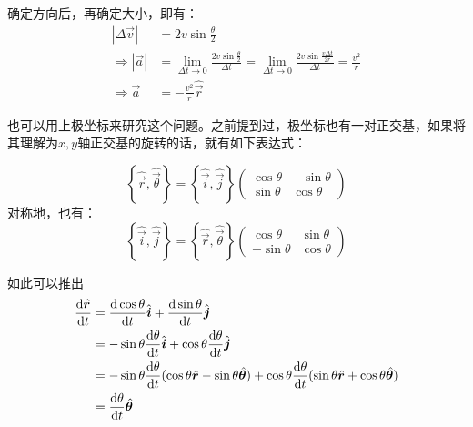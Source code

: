 确定方向后，再确定大小，即有：
\begin{equation}
    \begin{aligned}
        \left | \Delta \vec{v} \right |          & =2v\sin\frac{\theta}{2}                                                                                                                            \\
        \Longrightarrow \left | \vec{a} \right | & =\lim_{\Delta t \to 0}  \frac{2v\sin\frac{\theta}{2}}{\Delta t}=\lim_{\Delta t \to 0}  \frac{2v\sin\frac{v\Delta t}{2r}}{\Delta t}=\frac{v^{2}}{r} \\
        \Longrightarrow \vec{a}                  & =-\frac{v^{2}}{r}\hat{\vec{r}}
    \end{aligned}
    \nonumber
\end{equation}

也可以用上极坐标来研究这个问题。之前提到过，极坐标也有一对正交基，如果将其理解为$x,y$轴正交基的旋转的话，就有如下表达式：

\[\left \{ \hat{\vec{r}},\hat{\vec{\theta}} \right \} =\left \{ \hat{\vec{i}},\hat{\vec{j}} \right \}\begin{pmatrix}
        \cos\theta & -\sin\theta \\
        \sin\theta & \cos\theta
    \end{pmatrix} \]
对称地，也有：
\[\left \{ \hat{\vec{i}},\hat{\vec{j}} \right \} =\left \{ \hat{\vec{r}},\hat{\vec{\theta}} \right \}\begin{pmatrix}
        \cos\theta   & \sin\theta \\
        - \sin\theta & \cos\theta
    \end{pmatrix} \]

如此可以推出
\begin{equation}
    \begin{aligned}
        \frac{\dif \hat{\vec{r}}}{\dif t} & =\frac{\dif \cos\theta}{\dif t}\hat{\vec{i}}+\frac{\dif \sin\theta}{\dif t}\hat{\vec{j}}                                                                                                \\
                                          & =-\sin\theta\frac{\dif \theta}{\dif t}\hat{\vec{i}}+\cos\theta\frac{\dif \theta}{\dif t}\hat{\vec{j}}                                                                                   \\
                                          & =-\sin\theta\frac{\dif \theta}{\dif t}(\cos\theta\hat{\vec{r}}-\sin\theta\hat{\vec{\theta}})+\cos\theta\frac{\dif \theta}{\dif t}(\sin\theta\hat{\vec{r}}+\cos\theta\hat{\vec{\theta}}) \\
                                          & =\frac{\dif \theta}{\dif t}\hat{\vec{\theta}}
    \end{aligned}
    \nonumber
\end{equation}

